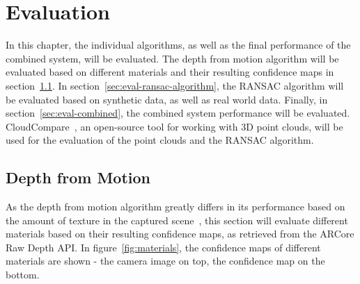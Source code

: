 \chapter{Evaluation}\label{ch:evaluation}
In this chapter, the individual algorithms, as well as the final performance of the combined system, will be evaluated.
The depth from motion algorithm will be evaluated based on different materials and their resulting confidence maps in section~\ref{sec:eval-depth-from-motion}.
In section~\ref{sec:eval-ransac-algorithm}, the RANSAC algorithm will be evaluated based on synthetic data, as well as real world data.
Finally, in section~\ref{sec:eval-combined}, the combined system performance will be evaluated.
CloudCompare~\cite{daniel_girardeau-montaut_cloudcompare_nodate}, an open-source tool for working with 3D point clouds, will be used for the evaluation of the point clouds and the RANSAC algorithm.

\section{Depth from Motion}\label{sec:eval-depth-from-motion}
As the depth from motion algorithm greatly differs in its performance based on the amount of texture in the captured scene~\cite{google_llc_arcore_doc},
this section will evaluate different materials based on their resulting confidence maps, as retrieved from the ARCore Raw Depth API\@.
In figure~\ref{fig:materials}, the confidence maps of different materials are shown - the camera image on top, the confidence map on the bottom.

